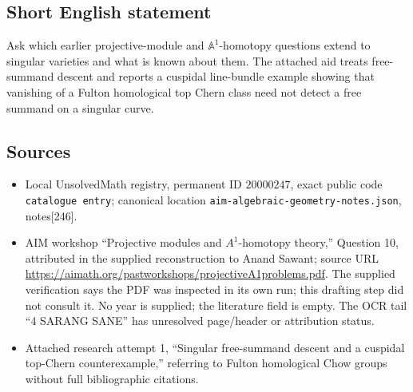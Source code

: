 \documentclass[11pt]{article}
\newcommand{\A}{\mathbb{A}}
\begin{document}
\subsection{Short English statement}
Ask which earlier projective-module and \(\A^1\)-homotopy questions extend to singular varieties and what is known about them. The attached aid treats free-summand descent and reports a cuspidal line-bundle example showing that vanishing of a Fulton homological top Chern class need not detect a free summand on a singular curve.
\subsection{Sources}
\begin{itemize}
\item Local UnsolvedMath registry, permanent ID \(20000247\), exact public code \texttt{catalogue entry}; canonical location \texttt{aim-algebraic-geometry-notes.json}, notes[246].
\item AIM workshop ``Projective modules and \(A^1\)-homotopy theory,'' Question 10, attributed in the supplied reconstruction to Anand Sawant; source URL \url{https://aimath.org/pastworkshops/projectiveA1problems.pdf}. The supplied verification says the PDF was inspected in its own run; this drafting step did not consult it. No year is supplied; the literature field is empty. The OCR tail ``4 SARANG SANE'' has unresolved page/header or attribution status.
\item Attached research attempt 1, ``Singular free-summand descent and a cuspidal top-Chern counterexample,'' referring to Fulton homological Chow groups without full bibliographic citations.
\end{itemize}
\end{document}

